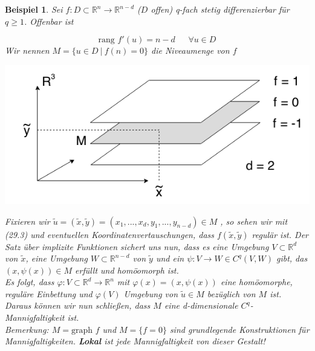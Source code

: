\documentclass[a4paper,12pt,portrait]{book}
\newcommand{\graph}{\text{graph\ }}
\newcommand{\rang}{\text{rang\ }}
\theoremstyle{theoremstyle}
\newtheorem{beispiel}[theo]{Beispiel}
\begin{document}
\begin{beispiel}
Sei $f:D\subset\mathbb{R}^n\rightarrow\mathbb{R}^{n-d}$ ($D$ offen) q-fach stetig differenzierbar für $q\geq 1$. Offenbar ist

\begin{equation}
\rang f'(u)=n-d \ \ \ \ \ \ \ \forall u\in D
\end{equation}
Wir nennen $M=\{u\in D \ | \ f(n)=0\}$ die Niveaumenge von $f$\\

\begin{center}\includegraphics[scale=0.5]{pictures/MA2_0009}\\
\end{center}
Fixieren wir $\tilde{u}=(\tilde{x},\tilde{y})=(x_1,...,x_d,y_1,...,y_{n-d})\in M$
, so sehen wir mit (29.3) und eventuellen Koordinatenvertauschungen, dass 
$f(\tilde{x},\tilde{y})$ regulär ist. Der \emph{Satz über implizite Funktionen}
sichert uns nun, dass es eine Umgebung $V\subset\mathbb{R}^d$ von $\tilde{x}$, 
eine Umgebung $W\subset\mathbb{R}^{n-d}$ von $\tilde{y}$ und ein 
$\psi:V\rightarrow W\in C^q(V,W)$ gibt, das $(x,\psi(x))\in M$ erfüllt und homöomorph ist.\\
Es folgt, dass $\varphi:V\subset\mathbb{R}^d\rightarrow\mathbb{R}^n$ mit
$\varphi(x)=(x,\psi(x))$ eine homöomorphe, reguläre Einbettung  und $\varphi(V)$ 
Umgebung von $\tilde{u}\in M$ bezüglich von $M$ ist. Daraus können wir nun schließen, 
dass $M$ eine d-dimensionale $C^q$-Mannigfaltigkeit ist.\\
\linebreak
\emph{Bemerkung: $M=\graph f$ und $M=\{f=0\}$ sind grundlegende Konstruktionen 
für Mannigfaltigkeiten. \textbf{Lokal} ist jede Mannigfaltigkeit von dieser Gestalt!}
\end{beispiel}
\end{document}
